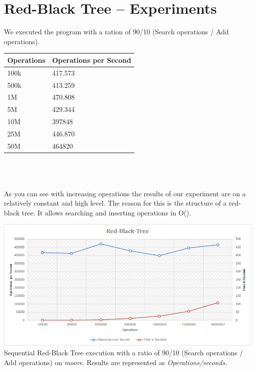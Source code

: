 \documentclass[oneside,a4paper]{scrartcl}
\begin{document}

\section{Red-Black Tree -- Experiments}
We executed the program with a ration of 90/10 (Search operations / Add operations).
\\
\begin{center}
\begin{tabular}{l|l}
Operations & Operations per Second\\\hline
100k & 417.573 \\
500k & 413.259\\
1M & 470.808\\
5M & 429.344\\
10M & 397848\\
25M & 446.870\\
50M & 464820\\
\end{tabular}
\end{center}\\
\\
\\
As you can see with increasing operations the results of our experiment are on a relatively constant and high level. The reason for this is the structure of a red-black tree. It allows searching and inserting operations in O().
\\
\begin{center}
	\includegraphics[width=0.8\columnwidth]{results.png}\\
	\caption{Sequential Red-Black Tree execution with a ratio of 90/10 (Search operations / Add operations) 
	on \emph{moore}. Results are represented as \it{Operations/seconds}.}
\end{center}
\\\\
\\\\
\end{document}
